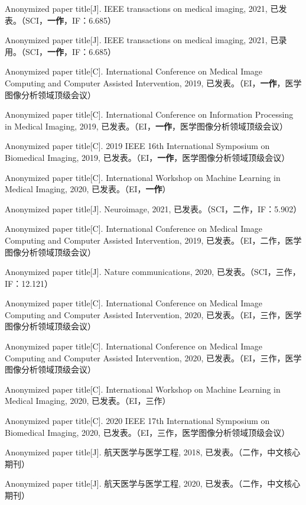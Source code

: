 \cleardoublepage
{}



%
        {
        \noindent [1] Anonymized paper title[J]. IEEE transactions on medical imaging, 2021, 已发表。（SCI，\textbf{一作}，IF：6.685）
        
        \noindent [2] Anonymized paper title[J]. IEEE transactions on medical imaging, 2021, 已录用。（SCI，\textbf{一作}，IF：6.685）
        
        \noindent [3] Anonymized paper title[C]. International Conference on Medical Image Computing and Computer Assisted Intervention, 2019, 已发表。（EI，\textbf{一作}，医学图像分析领域顶级会议）
        
        \noindent [4] Anonymized paper title[C]. International Conference on Information Processing in Medical Imaging, 2019, 已发表。（EI，\textbf{一作}，医学图像分析领域顶级会议）
        
        \noindent [5] Anonymized paper title[C]. 2019 IEEE 16th International Symposium on Biomedical Imaging, 2019, 已发表。（EI，\textbf{一作}，医学图像分析领域顶级会议）
        
        \noindent [6] Anonymized paper title[C]. International Workshop on Machine Learning in Medical Imaging, 2020, 已发表。（EI，\textbf{一作}）
        
        \noindent [7] Anonymized paper title[J]. Neuroimage, 2021, 已发表。（SCI，二作，IF：5.902） 
        
        \noindent [8] Anonymized paper title[C]. International Conference on Medical Image Computing and Computer Assisted Intervention, 2019, 已发表。（EI，二作，医学图像分析领域顶级会议）
        
        \noindent [9] Anonymized paper title[J]. Nature communications, 2020, 已发表。（SCI，三作，IF：12.121）
        
        \noindent [10] Anonymized paper title[C]. International Conference on Medical Image Computing and Computer Assisted Intervention, 2020, 已发表。（EI，三作，医学图像分析领域顶级会议）
        
        \noindent [11] Anonymized paper title[C]. International Conference on Medical Image Computing and Computer Assisted Intervention, 2020, 已发表。（EI，三作，医学图像分析领域顶级会议）
        
        \noindent [12] Anonymized paper title[C]. International Workshop on Machine Learning in Medical Imaging, 2020, 已发表。（EI，三作）
        
        \noindent [13] Anonymized paper title[C]. 2020 IEEE 17th International Symposium on Biomedical Imaging, 2020, 已发表。（EI，三作，医学图像分析领域顶级会议）
        
        \noindent [14] Anonymized paper title[J]. 航天医学与医学工程, 2018, 已发表。（二作，中文核心期刊）
        
        \noindent [15] Anonymized paper title[J]. 航天医学与医学工程, 2020, 已发表。（二作，中文核心期刊）
        }
        
